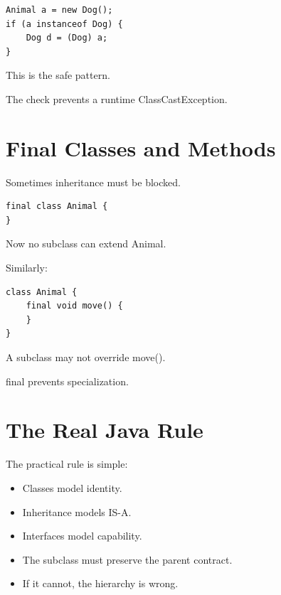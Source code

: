 \documentclass[11pt,a4paper]{book}
\begin{document}
\begin{verbatim}
Animal a = new Dog();
if (a instanceof Dog) {
    Dog d = (Dog) a;
}
\end{verbatim}


This is the safe pattern.

The check prevents a runtime ClassCastException.


\section{Final Classes and Methods}

Sometimes inheritance must be blocked.

\begin{verbatim}
final class Animal {
}
\end{verbatim}


Now no subclass can extend Animal.


Similarly:

\begin{verbatim}
class Animal {
    final void move() {
    }
}
\end{verbatim}


A subclass may not override move().


\begin{idea}
final prevents specialization.
\end{idea}


\section{The Real Java Rule}

The practical rule is simple:

\begin{itemize}
\item Classes model identity.
\item Inheritance models IS-A.
\item Interfaces model capability.
\item The subclass must preserve the parent contract.
\item If it cannot, the hierarchy is wrong.
\end{itemize}
\end{document}
